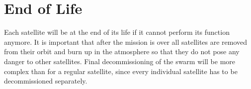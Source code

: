 \section{End of Life}
\label{SSEOL}

Each satellite will be at the end of its life if it cannot perform its function anymore.
It is important that after the mission is over all satellites are removed from their orbit and burn up in the atmosphere so that they do not pose any danger to other satellites.
Final decommissioning of the swarm will be more complex than for a regular satellite, since every individual satellite has to be decommissioned separately.